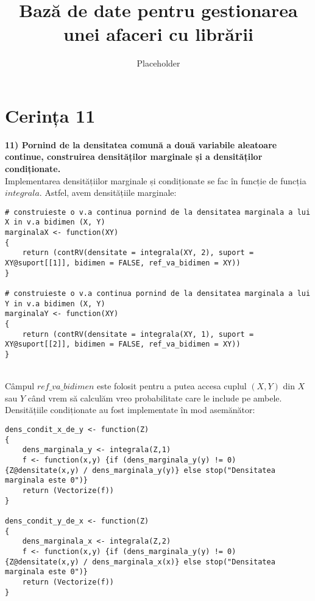 \documentclass[12pt]{article}
\title{Bază de date pentru gestionarea unei afaceri cu librării}
\author{Placeholder}
\begin{document}
\section{Cerința 11}
\textbf{11) Pornind  de  la  densitatea  comună  a  două  variabile  aleatoare  continue,  construirea densităților marginale și a densităților condiționate.} \hfill \\
\indent Implementarea densitățiilor marginale și condiționate se fac în funcție de funcția $integrala$. Astfel, avem densitățiile marginale:
\begin{lstlisting}
# construieste o v.a continua pornind de la densitatea marginala a lui X in v.a bidimen (X, Y)
marginalaX <- function(XY)
{
	return (contRV(densitate = integrala(XY, 2), suport = XY@suport[[1]], bidimen = FALSE, ref_va_bidimen = XY))
}

# construieste o v.a continua pornind de la densitatea marginala a lui Y in v.a bidimen (X, Y)
marginalaY <- function(XY)
{
	return (contRV(densitate = integrala(XY, 1), suport = XY@suport[[2]], bidimen = FALSE, ref_va_bidimen = XY))
}
\end{lstlisting} \hfill \\
\indent Câmpul $ref\_va\_bidimen$ este folosit pentru a putea accesa cuplul $(X, Y)$ din $X$ sau $Y$ când vrem să calculăm vreo probabilitate care le include pe ambele. \\
\indent Densitățiile condiționate au fost implementate în mod asemănător:
\begin{lstlisting}
dens_condit_x_de_y <- function(Z)
{
	dens_marginala_y <- integrala(Z,1)
	f <- function(x,y) {if (dens_marginala_y(y) != 0) {Z@densitate(x,y) / dens_marginala_y(y)} else stop("Densitatea marginala este 0")}
	return (Vectorize(f))
}

dens_condit_y_de_x <- function(Z)
{
	dens_marginala_x <- integrala(Z,2)
	f <- function(x,y) {if (dens_marginala_y(y) != 0) {Z@densitate(x,y) / dens_marginala_x(x)} else stop("Densitatea marginala este 0")}
	return (Vectorize(f))
}
\end{lstlisting}
\end{document}
